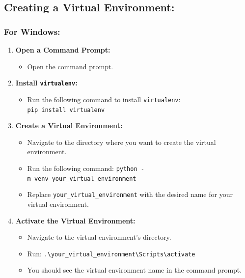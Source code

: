 \documentclass[
  letterpaper,
  DIV=11,
  numbers=noendperiod]{scrreprt}
\providecommand{\tightlist}{%
  \setlength{\itemsep}{0pt}\setlength{\parskip}{0pt}}\usepackage{longtable,booktabs,array}
\begin{document}
\subsection{Creating a Virtual
Environment:}\label{creating-a-virtual-environment}

\subsubsection{For Windows:}\label{for-windows-1}

\begin{enumerate}
\def\labelenumi{\arabic{enumi}.}
\tightlist
\item
  \textbf{Open a Command Prompt:}

  \begin{itemize}
  \tightlist
  \item
    Open the command prompt.
  \end{itemize}
\item
  \textbf{Install \texttt{virtualenv}:}

  \begin{itemize}
  \tightlist
  \item
    Run the following command to install \texttt{virtualenv}:
    \texttt{pip\ install\ virtualenv}
  \end{itemize}
\item
  \textbf{Create a Virtual Environment:}

  \begin{itemize}
  \tightlist
  \item
    Navigate to the directory where you want to create the virtual
    environment.
  \item
    Run the following command:
    \texttt{python\ -m\ venv\ your\_virtual\_environment}
  \item
    Replace \texttt{your\_virtual\_environment} with the desired name
    for your virtual environment.
  \end{itemize}
\item
  \textbf{Activate the Virtual Environment:}

  \begin{itemize}
  \tightlist
  \item
    Navigate to the virtual environment's directory.
  \item
    Run:
    \texttt{.\textbackslash{}your\_virtual\_environment\textbackslash{}Scripts\textbackslash{}activate}
  \item
    You should see the virtual environment name in the command prompt.
  \end{itemize}
\end{enumerate}
\end{document}
